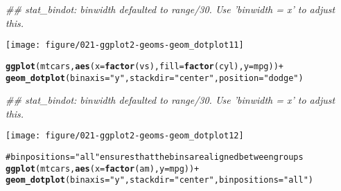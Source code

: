 \documentclass[a4paper,titlepage]{tufte-handout}\usepackage{graphicx, color}
\makeatletter
\def\maxwidth{ %
  \ifdim\Gin@nat@width>\linewidth
    \linewidth
  \else
    \Gin@nat@width
  \fi
}
\newcommand{\hlfunctioncall}[1]{\textcolor[rgb]{0.501960784313725,0,0.329411764705882}{\textbf{#1}}}%
\newcommand{\hlstring}[1]{\textcolor[rgb]{0.6,0.6,1}{#1}}%
\newenvironment{kframe}{%
 \def\at@end@of@kframe{}%
 \ifinner\ifhmode%
  \def\at@end@of@kframe{\end{minipage}}%
  \begin{minipage}{\columnwidth}%
 \fi\fi%
 \def\FrameCommand##1{\hskip\@totalleftmargin \hskip-\fboxsep
 \colorbox{shadecolor}{##1}\hskip-\fboxsep
     \hskip-\linewidth \hskip-\@totalleftmargin \hskip\columnwidth}%
 \MakeFramed {\advance\hsize-\width
   \@totalleftmargin\z@ \linewidth\hsize
   \@setminipage}}%
 {\par\unskip\endMakeFramed%
 \at@end@of@kframe}
\newenvironment{knitrout}{}{} %
\makeatother
\begin{document}
\begin{knitrout}
\begin{kframe}
{\ttfamily\noindent\itshape\textcolor{messagecolor}{\#\# stat\_bindot: binwidth defaulted to range/30. Use 'binwidth = x' to adjust this.}}\end{kframe}\texttt{[image: figure/021-ggplot2-geoms-geom\_dotplot11]} \begin{kframe}\begin{alltt}
\hlfunctioncall{ggplot}(mtcars, \hlfunctioncall{aes}(x = \hlfunctioncall{factor}(vs), fill = \hlfunctioncall{factor}(cyl), y = mpg)) +
  \hlfunctioncall{geom_dotplot}(binaxis = \hlstring{"y"}, stackdir = \hlstring{"center"}, position = \hlstring{"dodge"})
\end{alltt}


{\ttfamily\noindent\itshape\textcolor{messagecolor}{\#\# stat\_bindot: binwidth defaulted to range/30. Use 'binwidth = x' to adjust this.}}\end{kframe}\texttt{[image: figure/021-ggplot2-geoms-geom\_dotplot12]} \begin{kframe}\begin{alltt}
# binpositions=\hlstring{"all"} ensures that the bins are aligned between groups
\hlfunctioncall{ggplot}(mtcars, \hlfunctioncall{aes}(x = \hlfunctioncall{factor}(am), y = mpg)) +
  \hlfunctioncall{geom_dotplot}(binaxis = \hlstring{"y"}, stackdir = \hlstring{"center"}, binpositions=\hlstring{"all"})
\end{alltt}



\end{kframe}
\end{knitrout}
\end{document}
